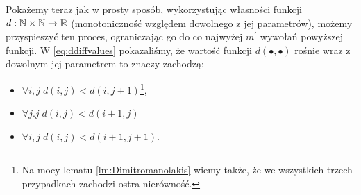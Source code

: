 {Pokażemy teraz jak w prosty sposób, wykorzystując własności funkcji $d: \mathbb{N} \times \mathbb{N} \rightarrow \mathbb{R}$ (monotoniczność względem dowolnego z jej parametrów), możemy przyspieszyć ten proces, ograniczając go do co najwyżej $m^{\prime}$ wywołań powyższej funkcji. W \ref{eq:ddiffvalues} pokazaliśmy, że wartość funkcji $d \left( \bullet, \bullet \right)$ rośnie wraz z dowolnym jej parametrem to znaczy zachodzą:

\begin{itemize}
	\item $\forall i, j \; d \left( i, j \right) < d \left( i, j + 1 \right)$\footnote{Na mocy lematu \ref{lm:Dimitromanolakis} wiemy także, że we wszystkich trzech przypadkach zachodzi ostra nierówność.},
	\item $\forall j. j \; d \left( i, j \right) < d \left( i + 1, j \right)$
	\item $\forall i, j \; d \left( i, j \right) < d \left( i + 1, j + 1 \right)$.
\end{itemize}

}
